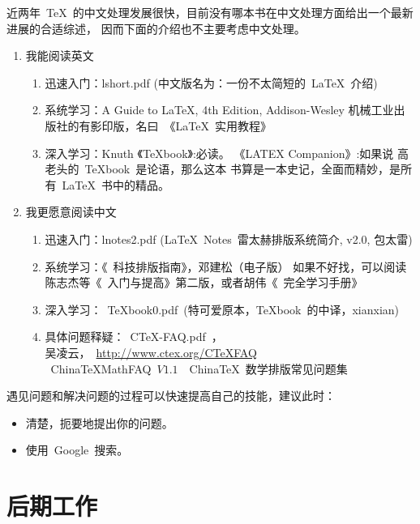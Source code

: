 近两年~\TeX~的中文处理发展很快，目前没有哪本书在中文处理方面给出一个最新进展的合适综述，
因而下面的介绍也不主要考虑中文处理。

\begin{enumerate}
\item 我能阅读英文
\begin{enumerate}
\item 迅速入门：lshort.pdf (中文版名为：一份不太简短的~\LaTeX{}~介绍)
\item 系统学习：A Guide to LaTeX, 4th Edition, Addison-Wesley
                机械工业出版社的有影印版，名曰~《\LaTeX{}~实用教程》
\item 深入学习：Knuth 《TeXbook》:必读。 《LATEX Companion》:如果说 高老头的~TeXbook~是论语，那么这本
               书算是一本史记，全面而精妙，是所有~\LaTeX~书中的精品。
\end{enumerate}

\item 我更愿意阅读中文
\begin{enumerate}
\item 迅速入门：lnotes2.pdf (\LaTeX~Notes~雷太赫排版系统简介, v2.0, 包太雷)
\item 系统学习：《\LaTeXe{}~科技排版指南》，邓建松（电子版）
      如果不好找，可以阅读陈志杰等《\LaTeXe~入门与提高》第二版，或者胡伟《\LaTeXe~完全学习手册》
\item 深入学习：~TeXbook0.pdf~(特可爱原本，TeXbook~的中译，xianxian)
\item 具体问题释疑：~CTeX-FAQ.pdf~，\\
        吴凌云，~\url{http://www.ctex.org/CTeXFAQ}~\\
      ~ChinaTeXMathFAQ~$V1.1$~~China\TeX~数学排版常见问题集
\end{enumerate}
\end{enumerate}

遇见问题和解决问题的过程可以快速提高自己的技能，建议此时：
\begin{itemize}
 \item 清楚，扼要地提出你的问题。
 \item 使用~Google~搜索。
\end{itemize}

\section{后期工作}


